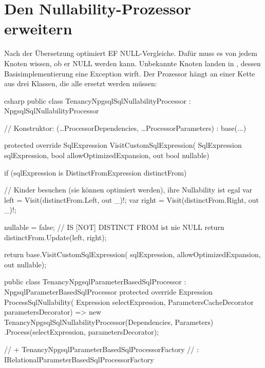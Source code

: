 \section{Den Nullability-Prozessor erweitern}

Nach der Übersetzung optimiert EF NULL-Vergleiche. Dafür muss es von jedem Knoten wissen, ob
er NULL werden kann. Unbekannte Knoten landen in
, dessen
Basisimplementierung eine Exception wirft. Der Prozessor hängt an einer Kette aus drei
Klassen, die alle ersetzt werden müssen:

\begin{sourcecode}{csharp}
public class TenancyNpgsqlSqlNullabilityProcessor : NpgsqlSqlNullabilityProcessor
{
    // Konstruktor: (…ProcessorDependencies, …ProcessorParameters) : base(...)

    protected override SqlExpression VisitCustomSqlExpression(
        SqlExpression sqlExpression, bool allowOptimizedExpansion, out bool nullable)
    {
        if (sqlExpression is DistinctFromExpression distinctFrom)
        {
            // Kinder besuchen (sie können optimiert werden), ihre Nullability ist egal
            var left = Visit(distinctFrom.Left, out _)!;
            var right = Visit(distinctFrom.Right, out _)!;

            nullable = false;                   // IS [NOT] DISTINCT FROM ist nie NULL
            return distinctFrom.Update(left, right);
        }

        return base.VisitCustomSqlExpression(
            sqlExpression, allowOptimizedExpansion, out nullable);
    }
}

public class TenancyNpgsqlParameterBasedSqlProcessor : NpgsqlParameterBasedSqlProcessor
{
    protected override Expression ProcessSqlNullability(
        Expression selectExpression, ParametersCacheDecorator parametersDecorator)
        => new TenancyNpgsqlSqlNullabilityProcessor(Dependencies, Parameters)
            .Process(selectExpression, parametersDecorator);
}

// + TenancyNpgsqlParameterBasedSqlProcessorFactory
//   : IRelationalParameterBasedSqlProcessorFactory
\end{sourcecode}

